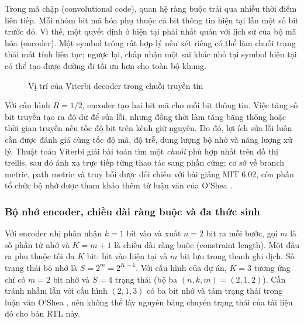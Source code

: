 \documentclass[12pt,a4paper]{article}
\renewcommand{\_}{\originalunderscore\allowbreak}
\begin{document}
Trong mã chập (convolutional code), quan hệ ràng buộc trải qua nhiều thời điểm liên tiếp. Mỗi nhóm bit mã hóa phụ thuộc cả bit thông tin hiện tại lẫn một số bit trước đó. Vì thế, một quyết định ở hiện tại phải nhất quán với lịch sử của bộ mã hóa (encoder). Một symbol trông rất hợp lý nếu xét riêng có thể làm chuỗi trạng thái mất tính liên tục; ngược lại, chấp nhận một sai khác nhỏ tại symbol hiện tại có thể tạo được đường đi tối ưu hơn cho toàn bộ khung.

\begin{figure}[H]\centering
{}
\caption{Vị trí của Viterbi decoder trong chuỗi truyền tin}\label{fig:theory-chain}
\end{figure}

Với cấu hình $R=1/2$, encoder tạo hai bit mã cho mỗi bit thông tin. Việc tăng số bit truyền tạo ra độ dư để sửa lỗi, nhưng đồng thời làm tăng băng thông hoặc thời gian truyền nếu tốc độ bit trên kênh giữ nguyên. Do đó, lợi ích sửa lỗi luôn cần được đánh giá cùng tốc độ mã, độ trễ, dung lượng bộ nhớ và năng lượng xử lý. Thuật toán Viterbi giải bài toán tìm một \emph{chuỗi} phù hợp nhất trên đồ thị trellis, sau đó ánh xạ trực tiếp từng thao tác sang phần cứng; cơ sở về branch metric, path metric và truy hồi được đối chiếu với bài giảng MIT 6.02, còn phần tổ chức bộ nhớ được tham khảo thêm từ luận văn của O'Shea \cite{mit-lecture,oshea-thesis}.

\subsubsection{Bộ nhớ encoder, chiều dài ràng buộc và đa thức sinh}
Với encoder nhị phân nhận $k=1$ bit vào và xuất $n=2$ bit ra mỗi bước, gọi $m$ là số phần tử nhớ và $K=m+1$ là chiều dài ràng buộc (constraint length). Một đầu ra phụ thuộc tối đa $K$ bit: bit vào hiện tại và $m$ bit lưu trong thanh ghi dịch. Số trạng thái bộ nhớ là $S=2^m=2^{K-1}$. Với cấu hình của dự án, $K=3$ tương ứng chỉ có $m=2$ bit nhớ và $S=4$ trạng thái (bộ ba $(n,k,m)=(2,1,2)$). Cần tránh nhầm lẫn với cấu hình $(2,1,3)$ có ba bit nhớ và tám trạng thái trong luận văn O'Shea \cite[Chương 2]{oshea-thesis}, nên không thể lấy nguyên bảng chuyển trạng thái của tài liệu đó cho bản RTL này.
\end{document}
